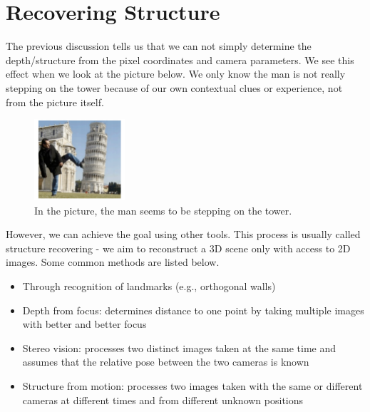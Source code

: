 \documentclass[]{article}
\begin{document}
	\section{Recovering Structure}
	The previous discussion tells us that we can not simply determine the depth/structure from the pixel coordinates and camera parameters. We see this effect when we look at the picture below. We only know the man is not really stepping on the tower because of our own contextual clues or experience, not from the picture itself.
	
	\begin{figure}[H]
		\includegraphics[width=0.3\textwidth]{stepping_on_tower.png}
		\centering
		\caption{In the picture, the man seems to be stepping on the tower.}
		\label{fig:stepping_on_tower}
	\end{figure}
	
	However, we can achieve the goal using other tools. This process is usually called structure recovering - we aim to reconstruct a 3D scene only with access to 2D images. Some common methods are listed below.
	
	\begin{itemize}
		\item Through	recognition of landmarks (e.g., orthogonal walls)
		\item Depth from focus: determines distance to one point by taking multiple images with better and better focus
		\item Stereo vision: processes two distinct images taken at the same time and assumes that the relative pose between the two cameras is known
		\item Structure from motion: processes two images taken with the same or different cameras at different times and from different unknown positions
	\end{itemize}
	
	
\end{document}
